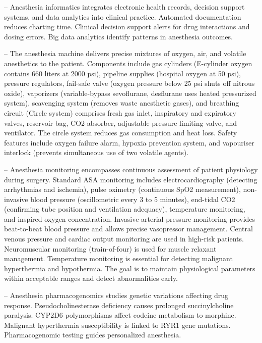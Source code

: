 -- Anesthesia informatics integrates electronic health records, decision support systems, and data analytics into clinical practice. Automated documentation reduces charting time. Clinical decision support alerts for drug interactions and dosing errors. Big data analytics identify patterns in anesthesia outcomes.

-- The anesthesia machine delivers precise mixtures of oxygen, air, and volatile anesthetics to the patient. Components include gas cylinders (E-cylinder oxygen contains 660 liters at 2000 psi), pipeline supplies (hospital oxygen at 50 psi), pressure regulators, fail-safe valve (oxygen pressure below 25 psi shuts off nitrous oxide), vaporizers (variable-bypass sevoflurane, desflurane uses heated pressurized system), scavenging system (removes waste anesthetic gases), and breathing circuit (Circle system) comprises fresh gas inlet, inspiratory and expiratory valves, reservoir bag, CO2 absorber, adjustable pressure limiting valve, and ventilator. The circle system reduces gas consumption and heat loss. Safety features include oxygen failure alarm, hypoxia prevention system, and vapouriser interlock (prevents simultaneous use of two volatile agents).

-- Anesthesia monitoring encompasses continuous assessment of patient physiology during surgery. Standard ASA monitoring includes electrocardiography (detecting arrhythmias and ischemia), pulse oximetry (continuous SpO2 measurement), non-invasive blood pressure (oscillometric every 3 to 5 minutes), end-tidal CO2 (confirming tube position and ventilation adequacy), temperature monitoring, and inspired oxygen concentration. Invasive arterial pressure monitoring provides beat-to-beat blood pressure and allows precise vasopressor management. Central venous pressure and cardiac output monitoring are used in high-risk patients. Neuromuscular monitoring (train-of-four) is used for muscle relaxant management. Temperature monitoring is essential for detecting malignant hyperthermia and hypothermia. The goal is to maintain physiological parameters within acceptable ranges and detect abnormalities early.

-- Anesthesia pharmacogenomics studies genetic variations affecting drug response. Pseudocholinesterase deficiency causes prolonged succinylcholine paralysis. CYP2D6 polymorphisms affect codeine metabolism to morphine. Malignant hyperthermia susceptibility is linked to RYR1 gene mutations. Pharmacogenomic testing guides personalized anesthesia.

